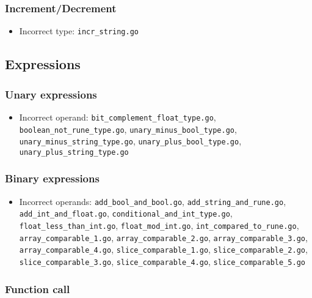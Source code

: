\documentclass{article}
\begin{document}
\subsubsection{Increment/Decrement}

\begin{itemize}
\item Incorrect type: \texttt{incr\_string.go}
\end{itemize}

\subsection{Expressions}

\subsubsection{Unary expressions}

\begin{itemize}
\item Incorrect operand: \texttt{bit\_complement\_float\_type.go}, \texttt{boolean\_not\_rune\_type.go}, \texttt{unary\_minus\_bool\_type.go}, \texttt{unary\_minus\_string\_type.go}, \texttt{unary\_plus\_bool\_type.go}, \texttt{unary\_plus\_string\_type.go}
\end{itemize}

\subsubsection{Binary expressions}

\begin{itemize}
\item Incorrect operands: \texttt{add\_bool\_and\_bool.go}, \texttt{add\_string\_and\_rune.go}, \texttt{add\_int\_and\_float.go}, \texttt{conditional\_and\_int\_type.go}, \texttt{float\_less\_than\_int.go}, \texttt{float\_mod\_int.go}, \texttt{int\_compared\_to\_rune.go}, \texttt{array\_comparable\_1.go}, \texttt{array\_comparable\_2.go}, \texttt{array\_comparable\_3.go}, \texttt{array\_comparable\_4.go}, \texttt{slice\_comparable\_1.go}, \texttt{slice\_comparable\_2.go}, \texttt{slice\_comparable\_3.go}, \texttt{slice\_comparable\_4.go}, \texttt{slice\_comparable\_5.go}
\end{itemize}

\subsubsection{Function call}
\end{document}
